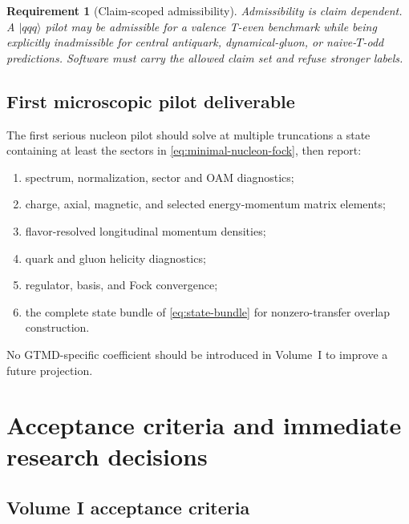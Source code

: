 \documentclass[11pt]{article}
\newtheorem{requirement}[definition]{Requirement}
\begin{document}
\begin{requirement}[Claim-scoped admissibility]
\label{req:claim-scoped}
Admissibility is claim dependent.  A \(|qqq\rangle\) pilot may be admissible
for a valence T-even benchmark while being explicitly inadmissible for central
antiquark, dynamical-gluon, or naive-\(T\)-odd predictions.  Software must
carry the allowed claim set and refuse stronger labels.
\end{requirement}

\subsection{First microscopic pilot deliverable}

The first serious nucleon pilot should solve at multiple truncations a state
containing at least the sectors in \cref{eq:minimal-nucleon-fock}, then
report:
\begin{enumerate}
\item spectrum, normalization, sector and OAM diagnostics;
\item charge, axial, magnetic, and selected energy-momentum matrix elements;
\item flavor-resolved longitudinal momentum densities;
\item quark and gluon helicity diagnostics;
\item regulator, basis, and Fock convergence;
\item the complete state bundle of \cref{eq:state-bundle} for nonzero-transfer
overlap construction.
\end{enumerate}
No GTMD-specific coefficient should be introduced in Volume~I to improve a
future projection.

\section{Acceptance criteria and immediate research decisions}
\label{sec:acceptance}

\subsection{Volume I acceptance criteria}
\end{document}
